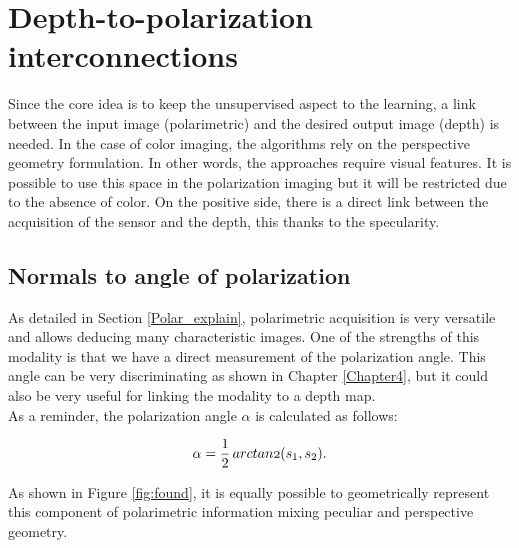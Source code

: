 \section{Depth-to-polarization interconnections}

Since the core idea is to keep the unsupervised aspect to the learning, a link between the input image (polarimetric) and the desired output image (depth) is needed. In the case of color imaging, the algorithms rely on the perspective geometry formulation. In other words, the approaches require visual features. 
It is possible to use this space in the polarization imaging but it will be restricted due to the absence of color. On the positive side, there is a direct link between the acquisition of the sensor and the depth, this thanks to the specularity.

\subsection{Normals to angle of polarization}

As detailed in Section \ref{Polar_explain}, polarimetric acquisition is very versatile and allows deducing many characteristic images. One of the strengths of this modality is that we have a direct measurement of the polarization angle. This angle can be very discriminating as shown in Chapter \ref{Chapter4}, but it could also be very useful for linking the modality to a depth map. \\
As a reminder, the polarization angle $\alpha$ is calculated as follows:

\begin{equation}
	\alpha = \frac{1}{2}\operatorname{\mathnormal{arctan2}}(s_1, s_2).
\end{equation}


As  shown in  Figure  \ref{fig:found},  it  is  equally  possible  to  geometrically  represent this component of polarimetric information mixing peculiar and  perspective  geometry.

